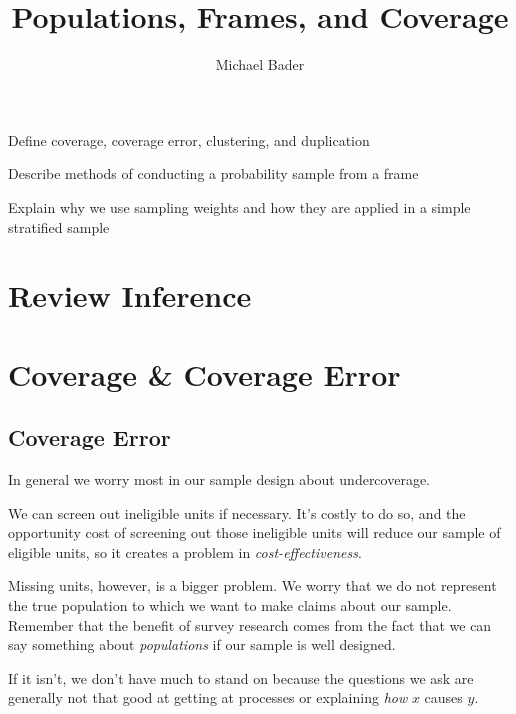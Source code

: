 \documentclass[11pt]{lecturenotes}
\title{Populations, Frames, and Coverage}
\author{Michael Bader}
\begin{document}
\maketitle

\begin{objectives}{
\item Define coverage, coverage error, clustering, and duplication
\item Describe methods of conducting a probability sample from a frame
\item Explain why we use sampling weights and how they are applied in a simple stratified sample}{
\objExplainPrinciples
}
\end{objectives}

\section[10]{Review Inference}

\section[]{Coverage \& Coverage Error}

\subsection[20]{Coverage Error}



In general we worry most in our sample design about undercoverage. 

We can screen out ineligible units if necessary. It's costly to do so, and the opportunity cost of screening out those ineligible units will reduce our sample of eligible units, so it creates a problem in \emph{cost-effectiveness}. 

Missing units, however, is a bigger problem. We worry that we do not represent the true population to which we want to make claims about our sample. Remember that the benefit of survey research comes from the fact that we can say something about \emph{populations} if our sample is well designed. 

If it isn't, we don't have much to stand on because the questions we ask are generally not that good at getting at processes or explaining \emph{how} $x$ causes $y$. 
\end{document}
